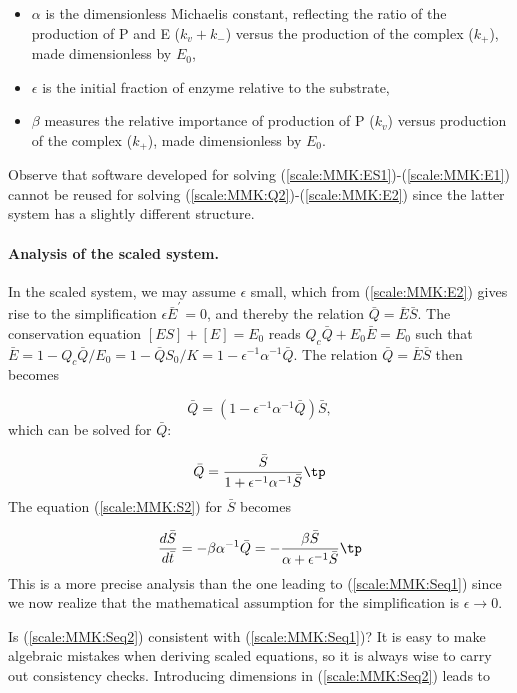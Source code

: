 \documentclass[graybox,envcountchap,sectrefs,final]{svmonodo}
\begin{document}
\begin{itemize}
 \item $\alpha$ is the dimensionless Michaelis constant, reflecting the
   ratio of the production of P and E ($k_v+k_-$) versus the production of
   the complex ($k_+$), made dimensionless by $E_0$,

 \item $\epsilon$ is the initial fraction of enzyme relative to the substrate,

 \item $\beta$ measures the relative importance of production of P ($k_v$)
   versus production of the complex ($k_+$), made dimensionless by $E_0$.
\end{itemize}

\noindent
Observe that software developed for
solving (\ref{scale:MMK:ES1})-(\ref{scale:MMK:E1}) cannot be reused
for solving (\ref{scale:MMK:Q2})-(\ref{scale:MMK:E2}) since the latter
system has a slightly different structure.


\paragraph{Analysis of the scaled system.}
In the scaled system, we may assume $\epsilon$ small, which from
(\ref{scale:MMK:E2}) gives rise to the simplification
$\epsilon\bar E^{\prime}=0$, and thereby the relation $\bar Q = \bar E\bar S$.
The conservation equation $[ES] + [E]= E_0$ reads $Q_c\bar Q + E_0\bar E =
E_0$ such that $\bar E = 1 - Q_c\bar Q/E_0=1- \bar Q S_0/K = 1 - \epsilon^{-1}\alpha^{-1}\bar Q$. The relation $\bar Q=\bar E\bar S$ then becomes

\[ \bar Q = (1 - \epsilon^{-1}\alpha^{-1}\bar Q)\bar S,\]
which can be solved for $\bar Q$:

\[ \bar Q = \frac{\bar S}{1 + \epsilon^{-1}\alpha^{-1}\bar S}\tp\]
The equation (\ref{scale:MMK:S2}) for $\bar S$ becomes

\begin{equation}
\frac{d\bar S}{d\bar t} = -\beta\alpha^{-1}\bar Q =
-\frac{\beta\bar S}{\alpha + \epsilon^{-1}\bar S}\tp
\label{scale:MMK:Seq2}
\end{equation}
This is a more precise analysis than the one leading to
(\ref{scale:MMK:Seq1}) since we now realize that the
mathematical assumption for the simplification is
$\epsilon\rightarrow 0$.

Is (\ref{scale:MMK:Seq2}) consistent with (\ref{scale:MMK:Seq1})? It is
easy to make algebraic mistakes when deriving scaled equations,
so it is always wise to carry out consistency checks.
Introducing dimensions in (\ref{scale:MMK:Seq2}) leads to
\end{document}
